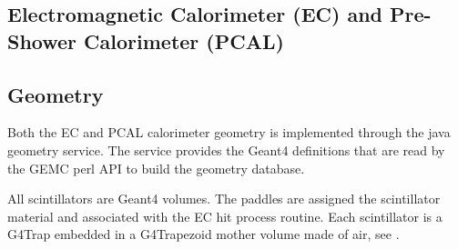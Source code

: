 \subsection{Electromagnetic Calorimeter (EC) and Pre-Shower Calorimeter (PCAL)}

\subsection{Geometry}

Both the EC and PCAL calorimeter geometry is implemented through the java geometry service.
The service provides the Geant4 definitions that are read by the GEMC perl API to build the geometry database.

All scintillators are Geant4 volumes. The paddles are assigned the scintillator material and associated with the EC hit process routine.
Each scintillator is a G4Trap embedded in a G4Trapezoid mother volume made of air, see .

